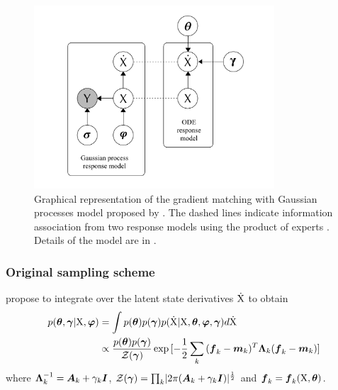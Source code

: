 \begin{figure}
    \centering
    \includegraphics[width=0.8\textwidth]{graphics/gradient-matching-model}
    \caption{Graphical representation of the gradient matching with Gaussian processes model proposed by \cite{calderhead2009accelerating}. The dashed lines indicate information association from two response models using the product of experts  . Details of the model are in .}    
    \label{fig-gmgp-model}
\end{figure}

\subsubsection*{Original sampling scheme}

\cite{calderhead2009accelerating} propose to integrate over the latent state derivatives $\mathrm{\dot{X}}$ to obtain
\begin{align}
    p(\boldsymbol{\theta},\boldsymbol{\gamma}\vert\mathrm{X},\boldsymbol{\varphi}) 
    & =
    \int{
        p(\boldsymbol{\theta}) p(\boldsymbol{\gamma}) p(\mathrm{\dot{X}}\vert\mathrm{X},\boldsymbol{\theta},\boldsymbol{\ensuremath{\varphi}},\boldsymbol{\gamma})d\mathrm{\dot{X}}}
    \nonumber
    \\
    & \propto
    \frac{p(\boldsymbol{\theta}) p(\boldsymbol{\gamma})}{\mathcal{Z}(\boldsymbol{\gamma})} 
    \exp{[
        -\frac{1}{2}\sum_k{
            (\boldsymbol{f}_{k} - \boldsymbol{m}_{k})^T\boldsymbol{\Lambda}_{k}(\boldsymbol{f}_{k} - \boldsymbol{m}_{k})}]}
\end{align}
where $\boldsymbol{\Lambda}_{k}^{-1} = \boldsymbol{A}_{k} + \gamma_{k}\boldsymbol{I}$, $\mathcal{Z}(\boldsymbol{\gamma}) = \prod_k \lvert 2\pi(\boldsymbol{A}_{k} + \gamma_{k}\boldsymbol{I}) \rvert^{\frac{1}{2}}$ and $\boldsymbol{f}_{k} = \boldsymbol{f}_{k}(\mathrm{X}, \boldsymbol{\theta})$.

